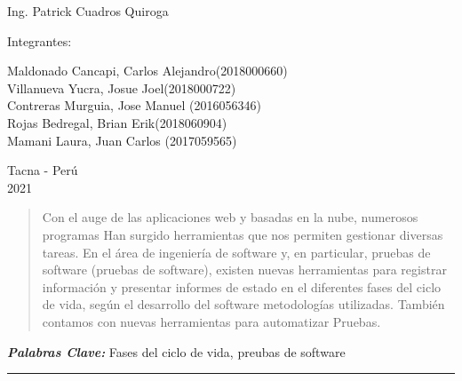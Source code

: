 \documentclass[12pt,letterpaper]{article}
\providecommand{\pclave}[1]
{
  \small	
  \textbf{\textit{Palabras Clave:}} #1
}
\begin{document}
\begin{titlepage}
\begin{center}
\vspace*{0.1in}
\begin{large}
 Ing. Patrick Cuadros Quiroga\\
\end{large}

\vspace*{0.2in}
\vspace*{0.1in}
\begin{large}
Integrantes:\\
\begin{flushleft}
Maldonado Cancapi, Carlos Alejandro\hfill(2018000660) \\
Villanueva Yucra, Josue Joel\hfill(2018000722)\\
Contreras Murguia, Jose Manuel \hfill(2016056346)\\
Rojas Bedregal, Brian Erik\hfill(2018060904)\\
Mamani Laura, Juan Carlos \hfill(2017059565)\\

\end{flushleft}
\end{large}

\vspace*{0.1in}
\begin{large}
Tacna - Perú\\
2021\\

\end{large}
\end{center}

\end{titlepage}

\begin{abstract}

    Con el auge de las aplicaciones web y basadas en la nube, numerosos programas
    Han surgido herramientas que nos permiten gestionar diversas tareas. En el área
    de ingeniería de software y, en particular, pruebas de software (pruebas de software),
    existen nuevas herramientas para registrar información y presentar informes de estado en el
    diferentes fases del ciclo de vida, según el desarrollo del software
    metodologías utilizadas. También contamos con nuevas herramientas para automatizar Pruebas.
\end{abstract}
\pclave{Fases del ciclo de vida, preubas de software}

\begin{center}\rule{1\textwidth}{0.05mm} \end{center}
\end{document}
